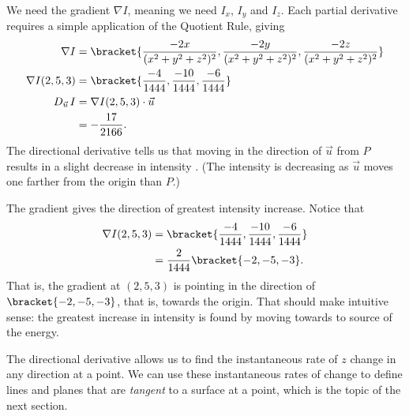 {We need the gradient $\nabla I$, meaning we need $I_x$, $I_y$ and $I_z$. Each partial derivative requires a simple application of the Quotient Rule, giving
\begin{align*}
\nabla I &=\bracket{\frac{-2x}{(x^2+y^2+z^2)^2},\frac{-2y}{(x^2+y^2+z^2)^2},\frac{-2z}{(x^2+y^2+z^2)^2}}\\
\nabla I(2,5,3) &=\bracket{\frac{-4}{1444},\frac{-10}{1444},\frac{-6}{1444}}%
\\
D_{\vec u\,}I &= \nabla I(2,5,3)\cdot \vec u\\
&= -\frac{17}{2166}%
.
\end{align*}
The directional derivative tells us that moving in the direction of $\vec u$ from $P$ results in a slight decrease in intensity%
. (The intensity is decreasing as $\vec u$ moves one farther from the origin than $P$.)

The gradient gives the direction of greatest intensity increase. Notice that 
\begin{align*}
\nabla I(2,5,3) &=\bracket{\frac{-4}{1444},\frac{-10}{1444},\frac{-6}{1444}}\\
			&= \frac{2}{1444}\bracket{-2,-5,-3}.
\end{align*}
That is, the gradient at $(2,5,3)$ is pointing in the direction of $\bracket{-2,-5,-3}$, that is, towards the origin. That should make intuitive sense: the greatest increase in intensity is found by moving towards to source of the energy.}

The directional derivative allows us to find the instantaneous rate of $z$ change in any direction at a point. We can use these instantaneous rates of change to define lines and planes that are \emph{tangent} to a surface at a point, which is the topic of the next section.


